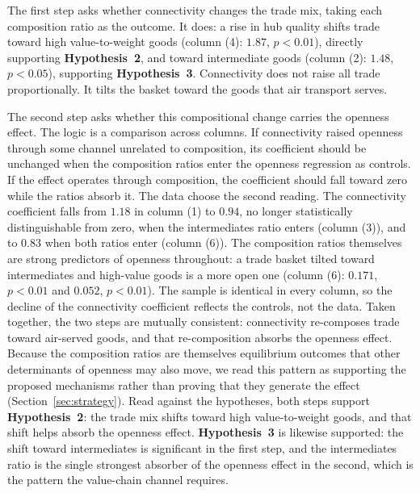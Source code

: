 The first step asks whether connectivity changes the trade mix, taking each composition ratio as the outcome. It does: a rise in hub quality shifts trade toward high value-to-weight goods (column (4): $1.87$, $p<0.01$), directly supporting \textbf{Hypothesis~2}, and toward intermediate goods (column (2): $1.48$, $p<0.05$), supporting \textbf{Hypothesis~3}. Connectivity does not raise all trade proportionally. It tilts the basket toward the goods that air transport serves.

The second step asks whether this compositional change carries the openness effect. The logic is a comparison across columns. If connectivity raised openness through some channel unrelated to composition, its coefficient should be unchanged when the composition ratios enter the openness regression as controls. If the effect operates through composition, the coefficient should fall toward zero while the ratios absorb it. The data choose the second reading. The connectivity coefficient falls from $1.18$ in column (1) to $0.94$, no longer statistically distinguishable from zero, when the intermediates ratio enters (column (3)), and to $0.83$ when both ratios enter (column (6)). The composition ratios themselves are strong predictors of openness throughout: a trade basket tilted toward intermediates and high-value goods is a more open one (column (6): $0.171$, $p<0.01$ and $0.052$, $p<0.01$). The sample is identical in every column, so the decline of the connectivity coefficient reflects the controls, not the data. Taken together, the two steps are mutually consistent: connectivity re-composes trade toward air-served goods, and that re-composition absorbs the openness effect. Because the composition ratios are themselves equilibrium outcomes that other determinants of openness may also move, we read this pattern as supporting the proposed mechanisms rather than proving that they generate the effect (Section~\ref{sec:strategy}). Read against the hypotheses, both steps support \textbf{Hypothesis~2}: the trade mix shifts toward high value-to-weight goods, and that shift helps absorb the openness effect. \textbf{Hypothesis~3} is likewise supported: the shift toward intermediates is significant in the first step, and the intermediates ratio is the single strongest absorber of the openness effect in the second, which is the pattern the value-chain channel requires.

